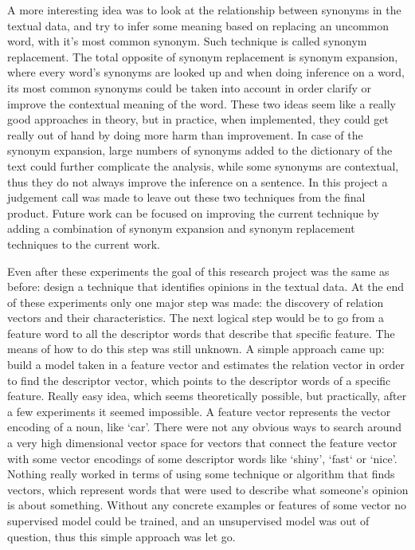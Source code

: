 \documentclass{sig-alternate}
\begin{document}
A more interesting idea was to look at the relationship between synonyms in the textual data, and try to infer some meaning based on replacing an uncommon word, with it’s most common synonym. Such technique is called synonym replacement. The total opposite of synonym replacement is synonym expansion, where every word’s synonyms are looked up and when doing inference on a word, its most common synonyms could be taken into account in order clarify or improve the contextual meaning of the word. These two ideas seem like a really good approaches in theory, but in practice, when implemented, they could get really out of hand by doing more harm than improvement. In case of the synonym expansion, large numbers of synonyms added to the dictionary of the text could further complicate the analysis, while some synonyms are contextual, thus they do not always improve the inference on a sentence. In this project a judgement call was made to leave out these two techniques from the final product. Future work can be focused on improving the current technique by adding a combination of synonym expansion and synonym replacement techniques to the current work.

Even after these experiments the goal of this research project was the same as before: design a technique that identifies opinions in the textual data. At the end of these experiments only one major step was made: the discovery of relation vectors and their characteristics. The next logical step would be to go from a feature word to all the descriptor words that describe that specific feature. The means of how to do this step was still unknown. A simple approach came up: build a model taken in a feature vector and estimates the relation vector in order to find the descriptor vector, which points to the descriptor words of a specific feature. Really easy idea, which seems theoretically possible, but practically, after a few experiments it seemed impossible. A feature vector represents the vector encoding of a noun, like `car'. There were not any obvious ways to search around a very high dimensional vector space for vectors that connect the feature vector with some vector encodings of some descriptor words like `shiny', `fast` or `nice'. Nothing really worked in terms of using some technique or algorithm that finds vectors, which represent words that were used to describe what someone's opinion is about something. Without any concrete examples or features of some vector no supervised model could be trained, and an unsupervised model was out of question, thus this simple approach was let go. 
\end{document}
